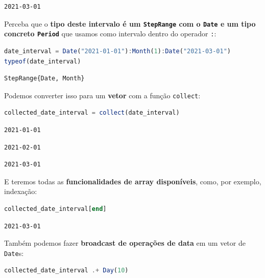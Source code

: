 \documentclass[
  notoc %
]{tufte-book}
\newcommand{\passthrough}[1]{#1}
\begin{document}
\begin{lstlisting}[language=Output]
2021-03-01
\end{lstlisting}

Perceba que o \textbf{tipo deste intervalo é um
\passthrough{\lstinline!StepRange!} com o \passthrough{\lstinline!Date!}
e um tipo concreto \passthrough{\lstinline!Period!}} que usamos como
intervalo dentro do operador \passthrough{\lstinline!:!}:

\begin{lstlisting}[language=Julia]
date_interval = Date("2021-01-01"):Month(1):Date("2021-03-01")
typeof(date_interval)
\end{lstlisting}

\begin{lstlisting}[language=Output]
StepRange{Date, Month}
\end{lstlisting}

Podemos converter isso para um \textbf{vetor} com a função
\passthrough{\lstinline!collect!}:

\begin{lstlisting}[language=Julia]
collected_date_interval = collect(date_interval)
\end{lstlisting}

\begin{lstlisting}[language=Output]
2021-01-01
\end{lstlisting}

\begin{lstlisting}[language=Output]
2021-02-01
\end{lstlisting}

\begin{lstlisting}[language=Output]
2021-03-01
\end{lstlisting}

E teremos todas as \textbf{funcionalidades de array disponíveis}, como,
por exemplo, indexação:

\begin{lstlisting}[language=Julia]
collected_date_interval[end]
\end{lstlisting}

\begin{lstlisting}[language=Output]
2021-03-01
\end{lstlisting}

Também podemos fazer \textbf{broadcast de operações de data} em um vetor
de \passthrough{\lstinline!Date!}s:

\begin{lstlisting}[language=Julia]
collected_date_interval .+ Day(10)
\end{lstlisting}
\end{document}
